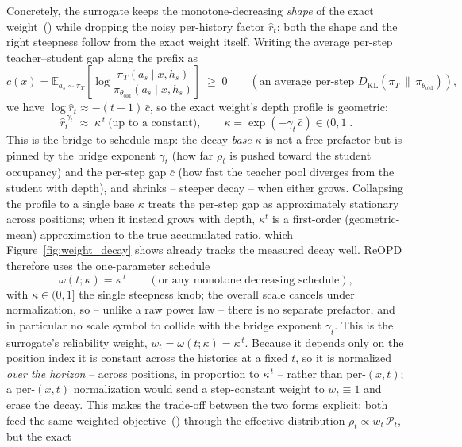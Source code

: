 Concretely, the surrogate keeps the monotone-decreasing \emph{shape} of the exact
weight~() while dropping the noisy per-history factor
\(\widehat r_t\); both the shape and the right steepness follow from the exact weight
itself. Writing the average per-step teacher--student gap along the prefix as
\[
\bar c(x)
=
\mathbb E_{a_s\sim\pi_T}\!\left[
\log\frac{\pi_T(a_s\mid x,h_s)}{\pi_{\theta_{\mathrm{old}}}(a_s\mid x,h_s)}
\right]
\;\ge\;0
\qquad(\text{an average per-step } D_{\mathrm{KL}}(\pi_T\,\|\,\pi_{\theta_{\mathrm{old}}})),
\]
we have \(\log\widehat r_t\approx-(t-1)\,\bar c\), so the exact weight's depth profile
is geometric:
\begin{equation}
\label{eq:kappa-map}
\widehat r_t^{\,\gamma_t}\;\approx\;\kappa^{\,t}\ \text{(up to a constant)},
\qquad
\kappa=\exp\!\left(-\gamma_t\,\bar c\right)\in(0,1].
\end{equation}
This is the bridge-to-schedule map: the decay \emph{base} \(\kappa\) is not a free
prefactor but is pinned by the bridge exponent \(\gamma_t\) (how far \(\rho_t\) is
pushed toward the student occupancy) and the per-step gap \(\bar c\) (how fast the
teacher pool diverges from the student with depth), and shrinks -- steeper decay --
when either grows. Collapsing the profile to a single base \(\kappa\) treats the
per-step gap as approximately stationary across positions; when it instead grows with
depth, \(\kappa^{t}\) is a first-order (geometric-mean) approximation to the true
accumulated ratio, which Figure~\ref{fig:weight_decay} shows already tracks the measured
decay well. ReOPD therefore uses the one-parameter schedule
\[
\omega(t;\kappa)=\kappa^{\,t}
\qquad(\text{or any monotone decreasing schedule}),
\]
with \(\kappa\in(0,1]\) the single steepness knob; the overall scale cancels under
normalization, so -- unlike a raw power law -- there is no separate prefactor, and in
particular no scale symbol to collide with the bridge exponent \(\gamma_t\). This is the surrogate's reliability weight,
\(w_t=\omega(t;\kappa)=\kappa^{\,t}\). Because it depends only on the position index it
is constant across the histories at a fixed \(t\), so it is normalized \emph{over the
horizon} -- across positions, in proportion to \(\kappa^{\,t}\) -- rather than
per-\((x,t)\); a per-\((x,t)\) normalization would send a step-constant weight to
\(w_t\!\equiv\!1\) and erase the decay. This makes the trade-off between the two forms
explicit: both feed the same weighted objective~() through the
effective distribution \(\rho_t\propto w_t\,\mathcal P_t\), but the exact
